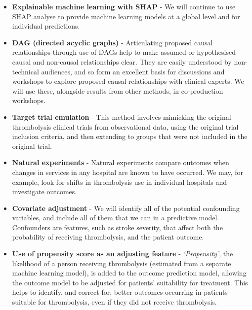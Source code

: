 \begin{itemize}

    \item \textbf{Explainable machine learning with SHAP} \cite{aas_explaining_2020} - We will continue to use SHAP analyse to provide machine learning models at a global level and for individual predictions.

    \item \textbf{DAG (directed acyclic graphs)} \cite{tennant_use_2021} - Articulating proposed causal relationships through use of DAGs help to make assumed or hypothesised causal and non-causal relationships clear. They are easily understood by non-technical audiences, and so form an excellent basis for discussions and workshops to explore proposed causal relationships with clinical experts. We will use these, alongside results from other methods, in co-production workshops.
    
    \item \textbf{Target trial emulation} \cite{bigirumurame_current_2023} - This method involves mimicking the original thrombolysis clinical trials from observational data, using the original trial inclusion criteria, and then extending to groups that were not included in the original trial.

    \item \textbf{Natural experiments} \cite{craig_natural_2017} - Natural experiments compare outcomes when changes in services in any hospital are known to have occurred. We may, for example, look for shifts in thrombolysis use in individual hospitals and investigate outcomes.

    \item \textbf{Covariate adjustment} \cite{igelstrom_causal_2022} - We will identify all of the potential confounding variables, and include all of them that we can in a predictive model. Confounders are features, such as stroke severity, that affect both the probability of receiving thrombolysis, and the patient outcome. 

    \item \textbf{Use of propensity score as an adjusting feature} \cite{rosenbaum_central_1983} - \textit{`Propensity'}, the likelihood of a person receiving thrombolysis (estimated from a separate machine learning model), is added to the outcome prediction model, allowing the outcome model to be adjusted for patients' suitability for treatment. This helps to identify, and correct for, better outcomes occurring in patients suitable for thrombolysis, even if they did not receive thrombolysis.


\end{itemize}
